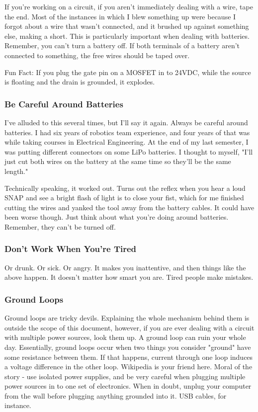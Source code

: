 If you're working on a circuit, if you aren't immediately dealing with a wire, tape the end. Most of the instances in which I blew something up were because I forgot about a wire that wasn't connected, and it brushed up against something else, making a short. This is particularly important when dealing with batteries. Remember, you can't turn a battery off. If both terminals of a battery aren't connected to something, the free wires should be taped over.

Fun Fact: If you plug the gate pin on a MOSFET in to 24VDC, while the source is floating and the drain is grounded, it explodes.

\subsubsection{Be Careful Around Batteries}

I've alluded to this several times, but I'll say it again. Always be careful around batteries. I had six years of robotics team experience, and four years of that was while taking courses in Electrical Engineering. At the end of my last semester, I was putting different connectors on some LiPo batteries. I thought to myself, "I'll just cut both wires on the battery at the same time so they'll be the same length."

Technically speaking, it worked out. Turns out the reflex when you hear a loud SNAP and see a bright flash of light is to close your fist, which for me finished cutting the wires and yanked the tool away from the battery cables. It could have been worse though. Just think about what you're doing around batteries. Remember, they can't be turned off.

\subsubsection{Don't Work When You're Tired}

Or drunk. Or sick. Or angry. It makes you inattentive, and then things like the above happen. It doesn't matter how smart you are. Tired people make mistakes.

\subsubsection{Ground Loops}

Ground loops are tricky devils. Explaining the whole mechanism behind them is outside the scope of this document, however, if you are ever dealing with a circuit with multiple power sources, look them up. A ground loop can ruin your whole day. Essentially, ground loops occur when two things you consider "ground" have some resistance between them. If that happens, current through one loop induces a voltage difference in the other loop. Wikipedia is your friend here. Moral of the story - use isolated power supplies, and be very careful when plugging multiple power sources in to one set of electronics. When in doubt, unplug your computer from the wall before plugging anything grounded into it. USB cables, for instance.

